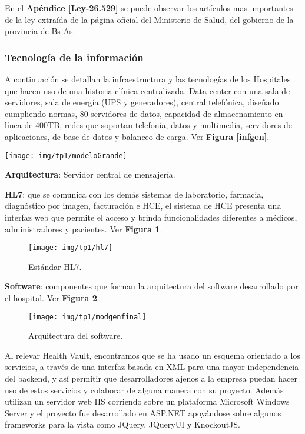 En el \textbf{Apéndice \ref{Ley-26.529}} se puede observar los artículos mas importantes de la ley extraída de la página oficial del Ministerio de Salud, del gobierno de la provincia de Bs As.




\subsubsection{Tecnología de la información}
 A continuación se detallan la infraestructura y las tecnologías de los Hospitales que hacen uso de una historia clínica centralizada.
 Data center con una sala de servidores, sala de energía (UPS y generadores), central telefónica, diseñado cumpliendo normas, 80 servidores de datos, capacidad de almacenamiento en línea de 400TB, redes que soportan telefonía, datos y multimedia, servidores de aplicaciones, de base de datos y balanceo de carga.
 Ver \textbf{Figura \ref{infgen}}.
 
\begin{sidewaysfigure}
  \centering
  \texttt{[image: img/tp1/modeloGrande]}
  \caption{Infraestructura general.}
  \label{infgen}
\end{sidewaysfigure}

    \textbf{Arquitectura}: Servidor central de mensajería.
    
\textbf{HL7}:
 que se comunica con los demás sistemas de laboratorio, farmacia, diagnóstico por imagen, facturación e HCE, el sistema de HCE presenta una interfaz web que permite el acceso y brinda funcionalidades diferentes a médicos, administradores y pacientes. Ver \textbf{Figura \ref{esthl7}}.
\begin{figure}
  \centering
  \texttt{[image: img/tp1/hl7]}
  \caption{Estándar HL7.}
  \label{esthl7}
\end{figure}

	\textbf{Software}: componentes que forman la arquitectura del software desarrollado por el hospital. Ver \textbf{Figura \ref{arqsw}}.
\begin{figure}
  \centering
  \texttt{[image: img/tp1/modgenfinal]}
  \caption{Arquitectura del software.}
  \label{arqsw}
\end{figure}

Al relevar Health Vault, encontramos que se ha usado un esquema orientado a los servicios, a través de una interfaz basada en XML para una mayor independencia del backend, y así permitir que desarrolladores ajenos a la empresa puedan hacer uso de estos servicios y colaborar de alguna manera con su proyecto. Además utilizan un servidor web IIS corriendo sobre un plataforma Microsoft Windows Server y el proyecto fue desarrollado en ASP.NET apoyándose sobre algunos frameworks para la vista como JQuery, JQueryUI y KnockoutJS.

